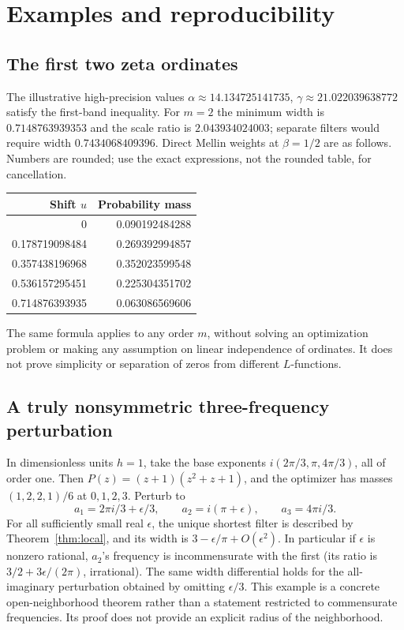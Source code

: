 \documentclass[11pt]{article}
\theoremstyle{remark}\newtheorem{remark}[theorem]{Remark}
\begin{document}
\section{Examples and reproducibility}
\subsection{The first two zeta ordinates}
The illustrative high-precision values $\alpha\approx14.134725141735$, $\gamma\approx21.022039638772$ satisfy the first-band inequality. For $m=2$ the minimum width is $0.7148763939353$ and the scale ratio is $2.043934024003$; separate filters would require width $0.7434068409396$. Direct Mellin weights at $\beta=1/2$ are as follows. Numbers are rounded; use the exact expressions, not the rounded table, for cancellation.
\begin{center}
\begin{tabular}{rr}
\toprule
Shift $u$ & Probability mass\\\midrule
0 & 0.090192484288\\
0.178719098484 & 0.269392994857\\
0.357438196968 & 0.352023599548\\
0.536157295451 & 0.225304351702\\
0.714876393935 & 0.063086569606\\\bottomrule
\end{tabular}
\end{center}
The same formula applies to any order $m$, without solving an optimization problem or making any assumption on linear independence of ordinates. It does not prove simplicity or separation of zeros from different $L$-functions.

\subsection{A truly nonsymmetric three-frequency perturbation}
In dimensionless units $h=1$, take the base exponents $i(2\pi/3,\pi,4\pi/3)$, all of order one. Then $P(z)=(z+1)(z^2+z+1)$, and the optimizer has masses $(1,2,2,1)/6$ at $0,1,2,3$. Perturb to
\[
 a_1=2\pi i/3+\epsilon/3,\qquad a_2=i(\pi+\epsilon),\qquad a_3=4\pi i/3.
\]
For all sufficiently small real $\epsilon$, the unique shortest filter is described by Theorem~\ref{thm:local}, and its width is $3-\epsilon/\pi+O(\epsilon^2)$. In particular if $\epsilon$ is nonzero rational, $a_2$'s frequency is incommensurate with the first (its ratio is $3/2+3\epsilon/(2\pi)$, irrational). The same width differential holds for the all-imaginary perturbation obtained by omitting $\epsilon/3$. This example is a concrete open-neighborhood theorem rather than a statement restricted to commensurate frequencies. Its proof does not provide an explicit radius of the neighborhood.
\end{document}
